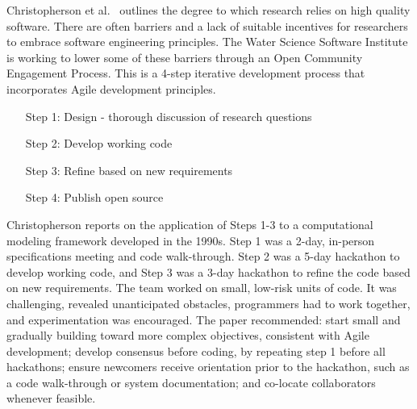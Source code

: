 \documentclass[11pt, oneside]{amsart}
\begin{document}


Christopherson et al.~\cite{Christopherson_WSSSPE} outlines the degree
to which research relies on high quality software. There are often
barriers and a lack of suitable incentives for researchers to embrace
software engineering principles. The Water Science Software Institute
is working to lower some of these barriers through an Open Community
Engagement Process. This is a 4-step iterative development process
that incorporates Agile development principles.

\begin{itemize}
\setlength{\itemindent}{0.5in}
\item[Step 1:] Design - thorough discussion of research questions
\item[Step 2:] Develop working code
\item[Step 3:] Refine based on new requirements
\item[Step 4:] Publish open source
\end{itemize}

Christopherson reports on the application of Steps 1-3 to a
computational modeling framework developed in the 1990s. Step 1 was a
2-day, in-person specifications meeting and code walk-through. Step 2
was a 5-day hackathon to develop working code, and Step 3 was a 3-day
hackathon to refine the code based on new requirements. The team
worked on small, low-risk units of code. It was challenging, revealed
unanticipated obstacles, programmers had to work together, and
experimentation was encouraged.
%
The paper recommended: start small and gradually building toward more
complex objectives, consistent with Agile development; develop
consensus before coding, by repeating step 1 before all hackathons;
ensure newcomers receive orientation prior to the hackathon, such as a
code walk-through or system documentation; and co-locate collaborators
whenever feasible.

\end{document}
